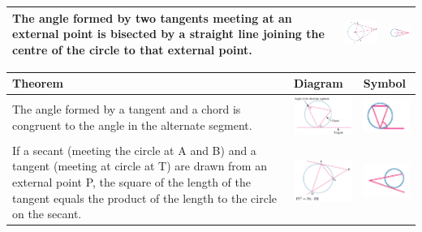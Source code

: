 \documentclass{book}
\begin{document}
\begin{center}
\begin{tabular}[center]{|p{5cm}|p{3cm}|p{2cm}|}
		The angle formed by two tangents meeting at an external point is bisected by a straight line joining the centre of the circle to that external point.                                    & \includegraphics[width=3cm]{circle theorem 10} & \includegraphics[width=2cm]{circle theorem 10 symbol} \\ \hline
	\end{tabular}
	\begin{tabular}[center]{|p{5cm}|p{3cm}|p{2cm}|}
		\hline
		Theorem                                                                                                                                                                                                                      & Diagram                                        & Symbol                                                \\ \hline
		The angle formed by a tangent and a chord is congruent to the angle in the alternate segment.                                                                                                                                & \includegraphics[width=3cm]{circle theorem 11} & \includegraphics[width=2cm]{circle theorem 11 symbol} \\ \hline
		If a secant (meeting the circle at A and B) and a tangent (meeting at circle at T) are drawn from an external point P, the square of the length of the tangent equals the product of the length to the circle on the secant. & \includegraphics[width=3cm]{circle theorem 12} & \includegraphics[width=2cm]{circle theorem 12 symbol} \\ \hline

\end{tabular}
\end{center}
\end{document}
